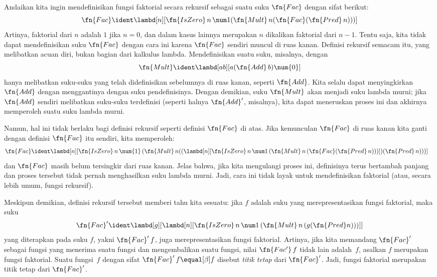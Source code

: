 \documentclass[../../../include/open-logic-section]{subfiles}
\begin{document}


Andaikan kita ingin mendefinisikan fungsi faktorial secara rekursif sebagai
suatu suku $\fn{Fac}$ dengan sifat berikut:
\[
\fn{Fac} \ident \lambd[n][\fn{IsZero}\, n\, \num 1 (\fn{Mult}\, n (\fn{Fac}(\fn{Pred} \, n)))]
\]
Artinya, faktorial dari $n$ adalah $1$ jika $n = 0$, dan dalam kasus lainnya
merupakan $n$ dikalikan faktorial dari $n-1$. Tentu saja, kita tidak dapat
mendefinisikan suku $\fn{Fac}$ dengan cara ini karena $\fn{Fac}$ sendiri
muncul di ruas kanan. Definisi rekursif semacam itu, yang melibatkan acuan
diri, bukan bagian dari kalkulus lambda. Mendefinisikan suatu suku, misalnya,
dengan
\[
\fn{Mult} \ident \lambd[ab][a (\fn{Add}\, b) \num{0}]
\]
hanya melibatkan suku-suku yang telah didefinisikan sebelumnya di ruas kanan,
seperti $\fn{Add}$. Kita selalu dapat menyingkirkan $\fn{Add}$ dengan
menggantinya dengan suku pendefinisinya. Dengan demikian, suku $\fn{Mult}$
akan menjadi suku lambda murni; jika $\fn{Add}$ sendiri melibatkan suku-suku
terdefinisi (seperti halnya $\fn{Add}'$, misalnya), kita dapat meneruskan
proses ini dan akhirnya memperoleh suatu suku lambda murni.

Namun, hal ini tidak berlaku bagi definisi rekursif seperti definisi
$\fn{Fac}$ di atas. Jika kemunculan $\fn{Fac}$ di ruas kanan kita ganti dengan
definisi $\fn{Fac}$ itu sendiri, kita memperoleh:
\begin{align*}
  \fn{Fac} & \ident \lambd[n][\fn{IsZero}\, n\, \num{1}\,
    (\fn{Mult}\, n
  ((\lambd[n][\fn{IsZero} \, n \, \num 1\, (\fn{Mult}\, n\, (\fn{Fac}
    (\fn{Pred}\, n)))]) (\fn{Pred}\, n)))]
\end{align*}
dan $\fn{Fac}$ masih belum tersingkir dari ruas kanan. Jelas bahwa, jika kita
mengulangi proses ini, definisinya terus bertambah panjang dan proses tersebut
tidak pernah menghasilkan suku lambda murni. Jadi, cara ini tidak layak untuk
mendefinisikan faktorial (atau, secara lebih umum, fungsi rekursif).

Meskipun demikian, definisi rekursif tersebut memberi tahu kita sesuatu:
jika $f$ adalah suku yang merepresentasikan fungsi faktorial, maka suku
\[
\fn{Fac}' \ident \lambd[g][\lambd[n][\fn{IsZero} \, n \, \num 1\, (\fn{Mult} \, n\, (g (\fn{Pred} n)))]]
\]
yang diterapkan pada suku $f$, yakni $\fn{Fac}'\,f$, juga merepresentasikan
fungsi faktorial. Artinya, jika kita memandang $\fn{Fac}'$ sebagai fungsi yang
menerima suatu fungsi dan mengembalikan suatu fungsi, nilai
$\fn{Fac'}\, f$ tidak lain adalah~$f$, asalkan $f$ merupakan fungsi faktorial.
Suatu fungsi~$f$ dengan sifat $\fn{Fac}' \, f \equal[\beta] f$ disebut
\emph{titik tetap} dari $\fn{Fac}'$. Jadi, fungsi faktorial merupakan titik
tetap dari $\fn{Fac}'$.
\end{document}
